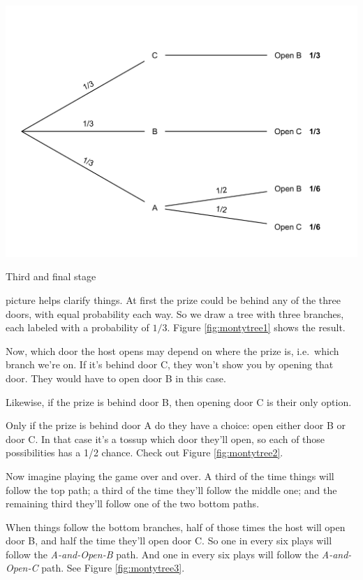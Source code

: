 \documentclass[justified]{tufte-book}
\theoremstyle{definition}
\theoremstyle{definition}
\theoremstyle{definition}
\theoremstyle{remark}
\begin{document}
\begin{marginfigure}
\includegraphics{_main_files/figure-latex/montytree3-1} \caption[Third and final stage]{Third and final stage}\label{fig:montytree3}
\end{marginfigure}

 picture helps clarify things. At first the prize could be behind any of the three doors, with equal probability each way. So we draw a tree with three branches, each labeled with a probability of \(1/3\). Figure \ref{fig:montytree1} shows the result.

Now, which door the host opens may depend on where the prize is, i.e.~which branch we're on. If it's behind door C, they won't show you by opening that door. They would have to open door B in this case.

Likewise, if the prize is behind door B, then opening door C is their only option.

Only if the prize is behind door A do they have a choice: open either door B or door C. In that case it's a tossup which door they'll open, so each of those possibilities has a 1/2 chance. Check out Figure \ref{fig:montytree2}.

Now imagine playing the game over and over. A third of the time things will follow the top path; a third of the time they'll follow the middle one; and the remaining third they'll follow one of the two bottom paths.

When things follow the bottom branches, half of those times the host will open door B, and half the time they'll open door C. So one in every six plays will follow the \emph{A-and-Open-B} path. And one in every six plays will follow the \emph{A-and-Open-C} path. See Figure \ref{fig:montytree3}.
\end{document}
